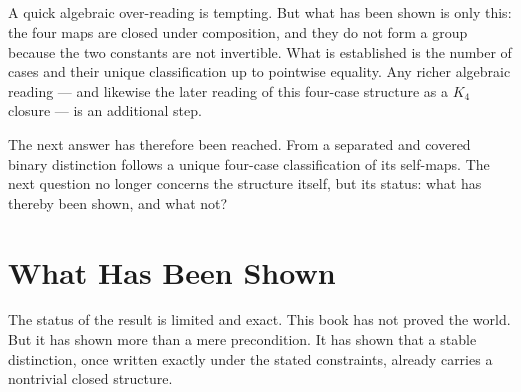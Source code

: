 \documentclass[11pt,a4paper]{book}
\begin{document}
\begin{code}
\AgdaSpace{}%
\AgdaSpace{}%
\AgdaSpace{}%
\AgdaSpace{}%
\<%
\\
%
\>[2]\AgdaSpace{}%
\AgdaSpace{}%
\AgdaSpace{}%
\AgdaSpace{}%
\AgdaSpace{}%
\<%
\\
%
\>[2]\AgdaSpace{}%
\AgdaSpace{}%
\<%
\\
\>[0]\AgdaSpace{}%
\AgdaSpace{}%
\AgdaSpace{}%
\AgdaSpace{}%
\AgdaSpace{}%
\AgdaSpace{}%
\AgdaSpace{}%
\AgdaSymbol{=}\<%
\\
\>[0][@{}l@{\AgdaIndent{0}}]%
\>[2]\AgdaSpace{}%
\AgdaSpace{}%
\AgdaSpace{}%
\AgdaSpace{}%
\AgdaSymbol{(}\AgdaSpace{}%
\AgdaSpace{}%
\AgdaSpace{}%
\AgdaSymbol{(}\AgdaSpace{}%
\AgdaSpace{}%
\AgdaSymbol{))}\<%
\end{code}

A quick algebraic over-reading is tempting. But what has been shown is only
this: the four maps are closed under composition, and they do not form a
group because the two constants are not invertible. What is established is
the number of cases and their unique classification up to pointwise
equality. Any richer algebraic reading --- and likewise the later reading
of this four-case structure as a $K_4$ closure --- is an additional step.

The next answer has therefore been reached. From a separated and covered
binary distinction follows a unique four-case classification of its
self-maps. The next question no longer concerns the structure itself, but
its status: what has thereby been shown, and what not?

\chapter{What Has Been Shown}
\label{ch:reading-the-threshold}
\label{ch:toward-form}
\label{ch:conclusion}

The status of the result is limited and exact. This book has not proved the
world. But it has shown more than a mere precondition. It has shown that a
stable distinction, once written exactly under the stated constraints,
already carries a nontrivial closed structure.
\end{document}
